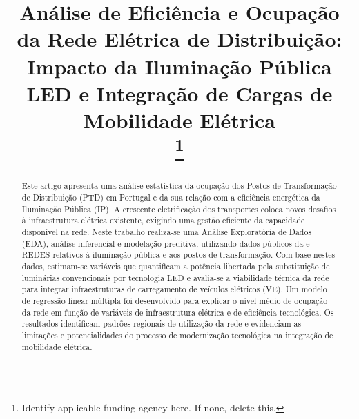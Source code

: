 \documentclass[conference]{IEEEtran}
\begin{document}
\title{Análise de Eficiência e Ocupação da Rede Elétrica de Distribuição: Impacto da Iluminação Pública LED e Integração de Cargas de Mobilidade Elétrica\\
\thanks{Identify applicable funding agency here. If none, delete this.}
}

\author{
\and
{}
\and
{}
}

\maketitle

\begin{abstract}
Este artigo apresenta uma análise estatística da ocupação dos Postos de Transformação de Distribuição (PTD) em Portugal e da sua relação com a eficiência energética da Iluminação Pública (IP). A crescente eletrificação dos transportes coloca novos desafios à infraestrutura elétrica existente, exigindo uma gestão eficiente da capacidade disponível na rede. Neste trabalho realiza-se uma Análise Exploratória de Dados (EDA), análise inferencial e modelação preditiva, utilizando dados públicos da e-REDES relativos à iluminação pública e aos postos de transformação. Com base nestes dados, estimam-se variáveis que quantificam a potência libertada pela substituição de luminárias convencionais por tecnologia LED e avalia-se a viabilidade técnica da rede para integrar infraestruturas de carregamento de veículos elétricos (VE). Um modelo de regressão linear múltipla foi desenvolvido para explicar o nível médio de ocupação da rede em função de variáveis de infraestrutura elétrica e de eficiência tecnológica. Os resultados identificam padrões regionais de utilização da rede e evidenciam as limitações e potencialidades do processo de modernização tecnológica na integração de mobilidade elétrica.
\end{abstract}
\end{document}
